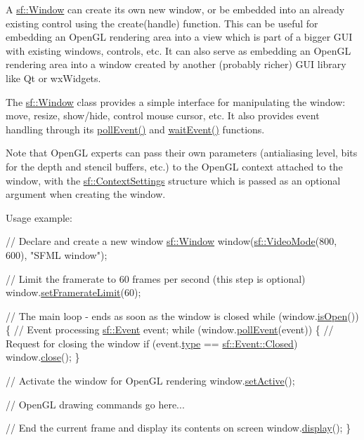 A \hyperlink{classsf_1_1_window}{sf\+::\+Window} can create its own new window, or be embedded into an already existing control using the create(handle) function. This can be useful for embedding an Open\+GL rendering area into a view which is part of a bigger G\+UI with existing windows, controls, etc. It can also serve as embedding an Open\+GL rendering area into a window created by another (probably richer) G\+UI library like Qt or wx\+Widgets.

The \hyperlink{classsf_1_1_window}{sf\+::\+Window} class provides a simple interface for manipulating the window\+: move, resize, show/hide, control mouse cursor, etc. It also provides event handling through its \hyperlink{classsf_1_1_window_a338e996585faf82e93069858e3b531b7}{poll\+Event()} and \hyperlink{classsf_1_1_window_aaf02ab64fbc1d374eef3696df54137bc}{wait\+Event()} functions.

Note that Open\+GL experts can pass their own parameters (antialiasing level, bits for the depth and stencil buffers, etc.) to the Open\+GL context attached to the window, with the \hyperlink{structsf_1_1_context_settings}{sf\+::\+Context\+Settings} structure which is passed as an optional argument when creating the window.

Usage example\+: 
\begin{DoxyCode}
\textcolor{comment}{// Declare and create a new window}
\hyperlink{classsf_1_1_window}{sf::Window} window(\hyperlink{classsf_1_1_video_mode}{sf::VideoMode}(800, 600), \textcolor{stringliteral}{"SFML window"});

\textcolor{comment}{// Limit the framerate to 60 frames per second (this step is optional)}
window.\hyperlink{classsf_1_1_window_af4322d315baf93405bf0d5087ad5e784}{setFramerateLimit}(60);

\textcolor{comment}{// The main loop - ends as soon as the window is closed}
\textcolor{keywordflow}{while} (window.\hyperlink{classsf_1_1_window_ae873503db7d48157bb9cbf6129562bce}{isOpen}())
\{
   \textcolor{comment}{// Event processing}
   \hyperlink{classsf_1_1_event}{sf::Event} event;
   \textcolor{keywordflow}{while} (window.\hyperlink{classsf_1_1_window_a338e996585faf82e93069858e3b531b7}{pollEvent}(event))
   \{
       \textcolor{comment}{// Request for closing the window}
       \textcolor{keywordflow}{if} (event.\hyperlink{classsf_1_1_event_adf2f8044f713fd9d6019077b0d1ffe0a}{type} == \hyperlink{classsf_1_1_event_af41fa9ed45c02449030699f671331d4aa316e4212e083f1dce79efd8d9e9c0a95}{sf::Event::Closed})
           window.\hyperlink{classsf_1_1_window_a99d1e030387b0c26f5995670504fe7b5}{close}();
   \}

   \textcolor{comment}{// Activate the window for OpenGL rendering}
   window.\hyperlink{classsf_1_1_window_aaab549da64cedf74fa6f1ae7a3cc79e0}{setActive}();

   \textcolor{comment}{// OpenGL drawing commands go here...}

   \textcolor{comment}{// End the current frame and display its contents on screen}
   window.\hyperlink{classsf_1_1_window_adabf839cb103ac96cfc82f781638772a}{display}();
\}
\end{DoxyCode}
 


